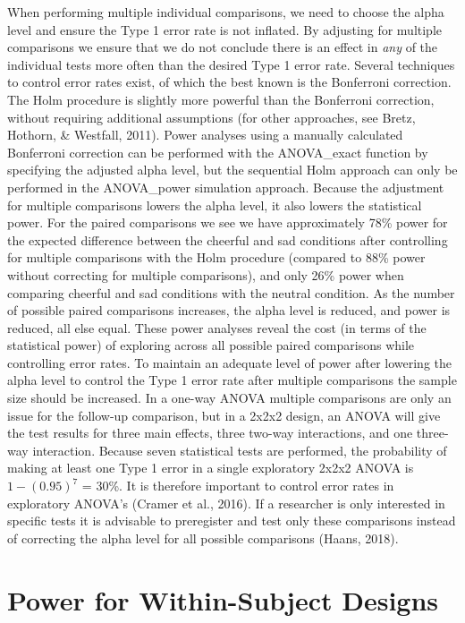\documentclass[
  english,
  ,jou,floatsintext]{apa6}
\begin{document}
When performing multiple individual comparisons, we need to choose the alpha level and ensure the Type 1 error rate is not inflated.
By adjusting for multiple comparisons we ensure that we do not conclude there is an effect in \emph{any} of the individual tests more often than the desired Type 1 error rate.
Several techniques to control error rates exist, of which the best known is the Bonferroni correction.
The Holm procedure is slightly more powerful than the Bonferroni correction, without requiring additional assumptions (for other approaches, see Bretz, Hothorn, \& Westfall, 2011).
Power analyses using a manually calculated Bonferroni correction can be performed with the ANOVA\_exact function by specifying the adjusted alpha level, but the sequential Holm approach can only be performed in the ANOVA\_power simulation approach.
Because the adjustment for multiple comparisons lowers the alpha level, it also lowers the statistical power.
For the paired comparisons we see we have approximately 78\% power for the expected difference between the cheerful and sad conditions after controlling for multiple comparisons with the Holm procedure (compared to 88\% power without correcting for multiple comparisons), and only 26\% power when comparing cheerful and sad conditions with the neutral condition.
As the number of possible paired comparisons increases, the alpha level is reduced, and power is reduced, all else equal.
These power analyses reveal the cost (in terms of the statistical power) of exploring across all possible paired comparisons while controlling error rates.
To maintain an adequate level of power after lowering the alpha level to control the Type 1 error rate after multiple comparisons the sample size should be increased.
In a one-way ANOVA multiple comparisons are only an issue for the follow-up comparison, but in a 2x2x2 design, an ANOVA will give the test results for three main effects, three two-way interactions, and one three-way interaction.
Because seven statistical tests are performed, the probability of making at least one Type 1 error in a single exploratory 2x2x2 ANOVA is \(1-(0.95)^7\) = 30\%.
It is therefore important to control error rates in exploratory ANOVA's (Cramer et al., 2016).
If a researcher is only interested in specific tests it is advisable to preregister and test only these comparisons instead of correcting the alpha level for all possible comparisons (Haans, 2018).

\hypertarget{power-for-within-subject-designs}{%
\section{Power for Within-Subject Designs}\label{power-for-within-subject-designs}}
\end{document}

